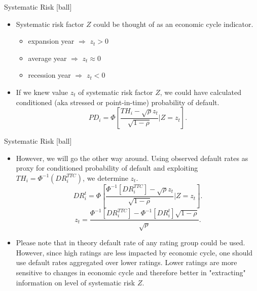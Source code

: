 \documentclass{beamer}
\begin{document}
\begin{frame}{Systematic Risk}
[ball]
\begin{itemize}
	\item Systematic risk factor $Z$ could be thought of as an economic cycle indicator.
		\begin{itemize}
			\item expansion year $\Rightarrow$ $z_t > 0$
			\item average year $\Rightarrow$ $z_t \approx 0$
			\item recession year $\Rightarrow$ $z_t < 0$
		\end{itemize}
	\item If we knew value $z_t$ of systematic risk factor $Z$, we could have calculated conditioned (aka stressed or point-in-time) probability of default.
		\begin{equation}
		PD_i = \Phi\left[\frac{TH_i - \sqrt{\rho}z_t}{\sqrt{1 - \rho}} | Z = 
		z_t\right].
		\end{equation}
\end{itemize}
\end{frame}

\begin{frame}{Systematic Risk}
[ball]
\begin{itemize}
	\item However, we will go the other way around. Using observed default rates as proxy for conditioned probability of default and exploiting $TH_i = \Phi^{-1}(DR_i^{TTC})$, we determine $z_t$.
		\begin{equation}
			DR_i^t= \Phi\left[\frac{\Phi^{-1}[DR_i^{TTC}] - \sqrt{\rho}z_t}{\sqrt{1 - \rho}} | Z = z_t\right].
		\end{equation}
		\begin{equation}
			z_t = \frac{\Phi^{-1}[DR_i^{TTC}] - \Phi^{-1}[DR_i^t]\sqrt{1 - \rho}}{\sqrt{\rho}}.
		\end{equation}
	\item Please note that in theory default rate of any rating group could be used. However, since high ratings are less impacted by economic cycle, one should use default rates aggregated over lower ratings. Lower ratings are more sensitive to changes in economic cycle and therefore better in "extracting" information on level of systematic risk $Z$.
\end{itemize}
\end{frame}
\end{document}
